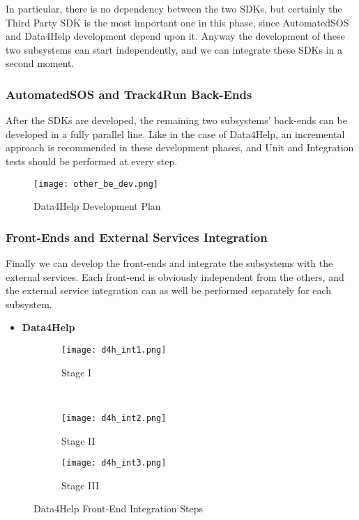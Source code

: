 In particular, there is no dependency between the two SDKs, but certainly the Third Party SDK is the most important one in this phase, since AutomatedSOS and Data4Help development depend upon it. Anyway the development of these two subsystems can start independently, and we can integrate these SDKs in a second moment.

\subsubsection{AutomatedSOS and Track4Run Back-Ends}
After the SDKs are developed, the remaining two subsystems' back-ends can be developed in a fully parallel line. Like in the case of Data4Help, an incremental approach is recommended in these development phases, and Unit and Integration tests should be performed at every step.

\FloatBarrier
\begin{figure}[!h]
	\centering
	\texttt{[image: other\_be\_dev.png]}
	\caption{Data4Help Development Plan}
\end{figure}
\FloatBarrier

\subsubsection{Front-Ends and External Services Integration}
Finally we can develop the front-ends and integrate the subsystems with the external services. Each front-end is obviously independent from the others, and the external service integration can as well be performed separately for each subsystem.

\begin{itemize}
	\item \textbf{Data4Help}
\end{itemize}

\FloatBarrier	
\begin{figure*}[ht!]	
	\centering	
	\begin{subfigure}[t]{0.5\textwidth}	
		\centering	
		\texttt{[image: d4h\_int1.png]}	
		\caption{Stage I}	
	\end{subfigure}%
	~ \vspace{20px}	
	\begin{subfigure}[t]{0.5\textwidth}	
		\centering	
		\texttt{[image: d4h\_int2.png]}	
		\caption{Stage II}	
	\end{subfigure}	
	\begin{subfigure}[t]{0.5\textwidth}	
		\centering	
		\texttt{[image: d4h\_int3.png]}	
		\caption{Stage III}	
	\end{subfigure}	
	
	\caption{Data4Help Front-End Integration Steps}	
\end{figure*}	

